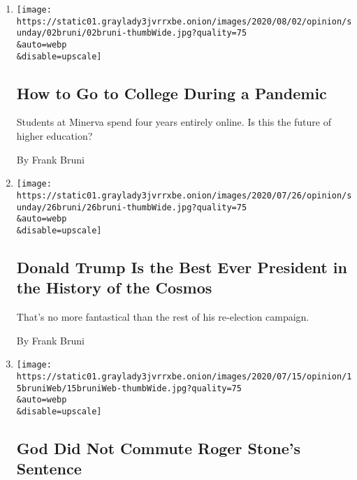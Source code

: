 \begin{enumerate}
\def\labelenumi{\arabic{enumi}.}
\item
  \href{/2020/08/01/opinion/minerva-college-coronavirus.html}{}

  \texttt{[image: https://static01.graylady3jvrrxbe.onion/images/2020/08/02/opinion/sunday/02bruni/02bruni-thumbWide.jpg?quality=75\\\&auto=webp\\\&disable=upscale]}

  \hypertarget{how-to-go-to-college-during-a-pandemic}{%
  \subsection{How to Go to College During a
  Pandemic}\label{how-to-go-to-college-during-a-pandemic}}

  Students at Minerva spend four years entirely online. Is this the
  future of higher education?

  By Frank Bruni
\item
  \href{/2020/07/25/opinion/sunday/trump-lies.html}{}

  \texttt{[image: https://static01.graylady3jvrrxbe.onion/images/2020/07/26/opinion/sunday/26bruni/26bruni-thumbWide.jpg?quality=75\\\&auto=webp\\\&disable=upscale]}

  \hypertarget{donald-trump-is-the-best-ever-president-in-the-history-of-the-cosmos}{%
  \subsection{Donald Trump Is the Best Ever President in the History of
  the
  Cosmos}\label{donald-trump-is-the-best-ever-president-in-the-history-of-the-cosmos}}

  That's no more fantastical than the rest of his re-election campaign.

  By Frank Bruni
\item
  \href{/2020/07/15/opinion/roger-stone-trump-god.html}{}

  \texttt{[image: https://static01.graylady3jvrrxbe.onion/images/2020/07/15/opinion/15bruniWeb/15bruniWeb-thumbWide.jpg?quality=75\\\&auto=webp\\\&disable=upscale]}

  \hypertarget{god-did-not-commute-roger-stones-sentence}{%
  \subsection{God Did Not Commute Roger Stone's
  Sentence}\label{god-did-not-commute-roger-stones-sentence}}


\end{enumerate}
